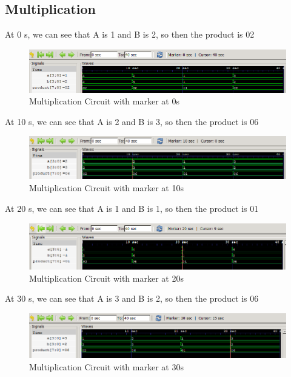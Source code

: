 \documentclass[12pt]{article}
\begin{document}
\subsection{Multiplication}

At 0 s, we can see that A is 1 and B is 2, so then the product is 02
\begin{figure}[h]
    \centering
    \includegraphics[width = 1.0\textwidth]{figs/Mult0.png}
    \caption{Multiplication Circuit with marker at 0s}
    \label{fig:enter-label}
\end{figure}

\newpage

At 10 s, we can see that A is 2 and B is 3, so then the product is 06
\begin{figure}[h]
    \centering
    \includegraphics[width = 1.0\textwidth]{figs/Mult10.png}
    \caption{Multiplication Circuit with marker at 10s}
    \label{fig:enter-label}
\end{figure}

At 20 s, we can see that A is 1 and B is 1, so then the product is 01
\begin{figure}[h]
    \centering
    \includegraphics[width = 1.0\textwidth]{figs/Mult20.png}
    \caption{Multiplication Circuit with marker at 20s}
    \label{fig:enter-label}
\end{figure}

At 30 s, we can see that A is 3 and B is 2, so then the product is 06
\begin{figure}[h]
    \centering
    \includegraphics[width = 1.0\textwidth]{figs/Mult30.png}
    \caption{Multiplication Circuit with marker at 30s}
    \label{fig:enter-label}
\end{figure}
\end{document}
